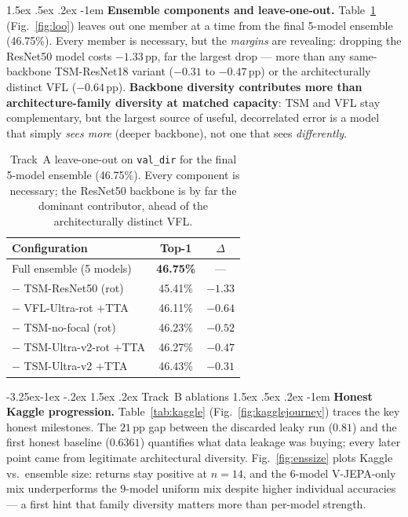 \documentclass[10pt,twocolumn,letterpaper]{article}
\makeatletter
\renewcommand\subsection{\@startsection{subsection}{2}{\z@}%
  {-3.25ex\@plus -1ex \@minus -.2ex}%
  {1.5ex \@plus .2ex}%
  {\normalfont\large\bfseries}}
\renewcommand\paragraph{\@startsection{paragraph}{4}{\z@}%
  {1.5ex \@plus .5ex \@minus .2ex}%
  {-1em}%
  {\normalfont\normalsize\bfseries}}
\makeatother
\begin{document}
\paragraph{\textbf{Ensemble components and leave-one-out.}}
\label{sec:loo}
Table~\ref{tab:loo} (Fig.~\ref{fig:loo}) leaves out one member at a time from
the final 5-model ensemble (46.75\%). Every member is necessary, but the
\emph{margins} are revealing: dropping the ResNet50 model costs $-1.33$\,pp,
far the largest drop --- more than any same-backbone TSM-ResNet18 variant
($-0.31$ to $-0.47$\,pp) or the architecturally distinct VFL ($-0.64$\,pp).
\textbf{Backbone diversity contributes more than architecture-family diversity
at matched capacity}: TSM and VFL stay complementary, but the largest source of
useful, decorrelated error is a model that simply \emph{sees more} (deeper
backbone), not one that sees \emph{differently}.

\begin{table}[t]
\centering\small
\begin{tabular}{@{}lcc@{}}
\toprule
Configuration & Top-1 & $\Delta$ \\
\midrule
Full ensemble (5 models)             & \textbf{46.75\%} & --- \\
\;$-$ TSM-ResNet50 (rot)             & 45.41\% & $-1.33$ \\
\;$-$ VFL-Ultra-rot $+$TTA           & 46.11\% & $-0.64$ \\
\;$-$ TSM-no-focal (rot)             & 46.23\% & $-0.52$ \\
\;$-$ TSM-Ultra-v2-rot $+$TTA        & 46.27\% & $-0.47$ \\
\;$-$ TSM-Ultra-v2 $+$TTA            & 46.43\% & $-0.31$ \\
\bottomrule
\end{tabular}
\caption{Track~A leave-one-out on \texttt{val\_dir} for the final 5-model
ensemble (46.75\%). Every component is necessary; the ResNet50 backbone is by
far the dominant contributor, ahead of the architecturally distinct VFL.}
\label{tab:loo}
\end{table}

\subsection{Track~B ablations}
\paragraph{\textbf{Honest Kaggle progression.}}
Table~\ref{tab:kaggle} (Fig.~\ref{fig:kagglejourney}) traces the key honest
milestones. The $21$\,pp gap between the discarded leaky run ($0.81$) and the
first honest baseline ($0.6361$) quantifies what data leakage was buying; every
later point came from legitimate architectural diversity. Fig.~\ref{fig:enssize}
plots Kaggle vs.\ ensemble size: returns stay positive at $n{=}14$, and the
$6$-model V-JEPA-only mix underperforms the $9$-model uniform mix despite
higher individual accuracies --- a first hint that family diversity matters
more than per-model strength.
\end{document}
